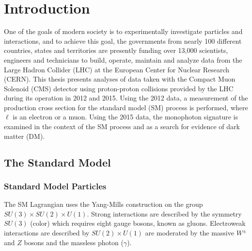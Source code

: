 
\chapter{Introduction}\label{sec:introduction}

 One of the goals of modern society is
  to experimentally investigate particles and
  interactions, and 
  to achieve this goal, the governments from 
  nearly 100 %
  different countries, states and territories are
  presently funding over 13,000 scientists, engineers 
  and technicians to build, operate, maintain 
  and analyze data from the
  Large Hadron Collider (LHC)
  at the European Center for Nuclear Research (CERN).
 This thesis presents analyses of data taken
  with the Compact Muon Solenoid (CMS) detector
  using proton-proton collisions provided by the LHC
  during its operation in 2012 and 2015.
 Using the 2012 data, a measurement
  of the production cross section for
  the standard model (SM) process
  \ppwbblnbb is performed,
  where $\ell$ is an electron or a muon.
 Using the 2015 data, the monophoton signature
  is examined in the context of the SM
  process \ppzgnng and as a search for
  evidence of dark matter (DM).

\section{The Standard Model}
\subsection{Standard Model Particles}
  The SM Lagrangian uses the
   Yang-Mills construction on the group
   $SU(3)\times SU(2)\times U(1)$.
  Strong interactions are described by the symmetry $SU(3)$ (color)
   which requires eight gauge bosons, known as gluons.
  Electroweak interactions are described by
   $SU(2)\times U(1)$ are moderated by the 
   massive $W^\pm$ and $Z$ bosons and the massless
   photon ($\gamma$).

